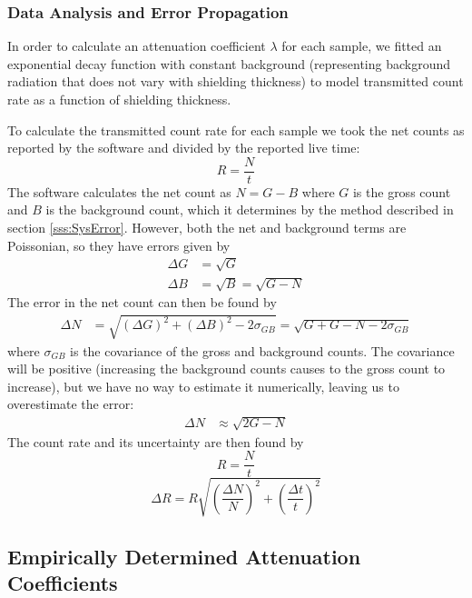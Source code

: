 \documentclass[letter]{article}
\begin{document}
\subsubsection{Data Analysis and Error Propagation}

In order to calculate an attenuation coefficient $\lambda$ for each sample, we fitted an exponential decay function with constant background (representing background radiation that does not vary with shielding thickness) to model transmitted count rate as a function of shielding thickness.

To calculate the transmitted count rate for each sample we took the net counts as reported by the software and divided by the reported live time:
\begin{equation}
R = \frac{N}{t}
\end{equation}
The software calculates the net count as $N = G - B$ where $G$ is the gross count and $B$ is the background count, which it determines by the method described in section \ref{sss:SysError}. However, both the net and background terms are Poissonian, so they have errors given by
\begin{align}
\Delta G &= \sqrt{G} \\
\Delta B &= \sqrt{B} = \sqrt{G - N}
\end{align}
The error in the net count can then be found by
\begin{align}
\Delta N 
&= 
\sqrt{ (\Delta G)^2 + (\Delta B)^2 - 2 \sigma_{GB}}
=
\sqrt{ G + G - N - 2 \sigma_{GB}}
\end{align}
where $\sigma_{GB}$ is the covariance of the gross and background counts. The covariance will be positive (increasing the background counts causes to the gross count to increase), but we have no way to estimate it numerically, leaving us to overestimate the error:
\begin{align}
\Delta N &\approx \sqrt{2G - N}
\end{align} 
The count rate and its uncertainty are then found by
\begin{equation}
R = \frac{N}{t}
\end{equation}
\begin{equation}
\Delta R = R \sqrt{ \left( \frac{\Delta N}{N} \right)^2 + \left( \frac{\Delta t}{t} \right)^2}
\end{equation}


\subsection{Empirically Determined Attenuation Coefficients}
\end{document}
